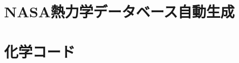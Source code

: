 \documentclass{jsarticle}
\begin{document}
\section{NASA熱力学データベース自動生成}
\section{化学コード}

%
%
%
\end{document}
